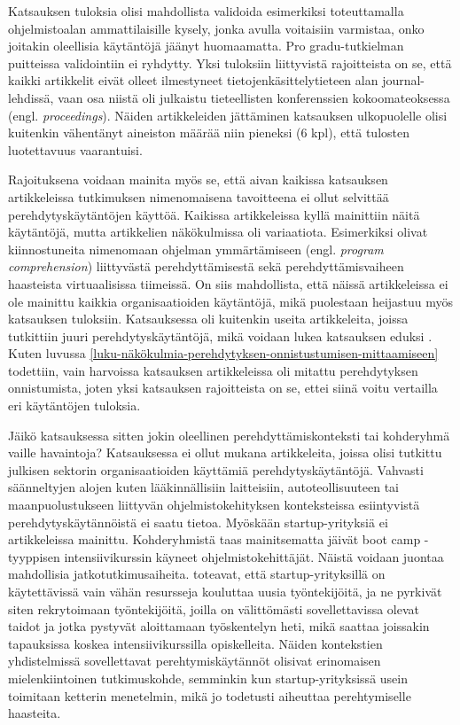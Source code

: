 \documentclass[utf8]{gradu3}
\begin{document}
Katsauksen tuloksia olisi mahdollista validoida esimerkiksi toteuttamalla ohjelmistoalan ammattilaisille kysely, jonka avulla voitaisiin varmistaa, onko joitakin oleellisia käytäntöjä jäänyt huomaamatta. Pro gradu-tutkielman puitteissa validointiin ei ryhdytty. Yksi tuloksiin liittyvistä rajoitteista on se, että kaikki artikkelit eivät olleet ilmestyneet tietojenkäsittelytieteen alan journal-lehdissä, vaan osa niistä oli julkaistu tieteellisten konferenssien kokoomateoksessa (engl. \textit{proceedings}). Näiden artikkeleiden jättäminen katsauksen ulkopuolelle olisi kuitenkin vähentänyt aineiston määrää niin pieneksi (6 kpl), että tulosten luotettavuus vaarantuisi.

Rajoituksena voidaan mainita myös se, että aivan kaikissa katsauksen artikkeleissa tutkimuksen nimenomaisena tavoitteena ei ollut selvittää perehdytyskäytäntöjen käyttöä. Kaikissa artikkeleissa kyllä mainittiin näitä käytäntöjä, mutta artikkelien näkökulmissa oli variaatiota. Esimerkiksi \textcite{yates-ym-2020} olivat kiinnostuneita nimenomaan ohjelman ymmärtämiseen (engl. \textit{program comprehension}) liittyvästä perehdyttämisestä sekä \textcite{hemphill-begel-2011} perehdyttämisvaiheen haasteista virtuaalisissa tiimeissä. On siis mahdollista, että näissä artikkeleissa ei ole mainittu kaikkia organisaatioiden käytäntöjä, mikä puolestaan heijastuu myös katsauksen tuloksiin. Katsauksessa oli kuitenkin useita artikkeleita, joissa tutkittiin juuri perehdytyskäytäntöjä, mikä voidaan lukea katsauksen eduksi
%
\parencites%
    {ju-ym-2021}%
    {britto-ym-2020}%
    {moe-ym-2020}%
    {viviani-murphy-2019}%
    {buchan-ym-2019}%
    {johnson-senges-2010}%
\relax.
%
Kuten luvussa \ref{luku-näkökulmia-perehdytyksen-onnistustumisen-mittaamiseen} todettiin, vain harvoissa katsauksen artikkeleissa oli mitattu perehdytyksen onnistumista, joten yksi katsauksen rajoitteista on se, ettei siinä voitu vertailla eri käytäntöjen tuloksia. 

Jäikö katsauksessa sitten jokin oleellinen perehdyttämiskonteksti tai kohderyhmä vaille havaintoja? Katsauksessa ei ollut mukana artikkeleita, joissa olisi tutkittu julkisen sektorin organisaatioiden käyttämiä perehdytyskäytäntöjä. Vahvasti säänneltyjen alojen kuten lääkinnällisiin laitteisiin, autoteollisuuteen tai maanpuolustukseen liittyvän ohjelmistokehityksen konteksteissa esiintyvistä perehdytyskäytännöistä ei saatu tietoa. Myöskään startup-yrityksiä ei artikkeleissa mainittu. Kohderyhmistä taas mainitsematta jäivät boot camp -tyyppisen intensiivikurssin käyneet ohjelmistokehittäjät. Näistä voidaan juontaa mahdollisia jatkotutkimusaiheita. \textcite{lyon-green-2021} toteavat, että startup-yrityksillä on käytettävissä vain vähän resursseja kouluttaa uusia työntekijöitä, ja ne pyrkivät siten rekrytoimaan työntekijöitä, joilla on välittömästi sovellettavissa olevat taidot ja jotka pystyvät aloittamaan työskentelyn heti, mikä saattaa joissakin tapauksissa koskea intensiivikurssilla opiskelleita. Näiden kontekstien yhdistelmissä sovellettavat perehtymiskäytännöt olisivat erinomaisen mielenkiintoinen tutkimuskohde, semminkin kun startup-yrityksissä usein toimitaan ketterin menetelmin, mikä jo todetusti aiheuttaa perehtymiselle haasteita.
\end{document}
